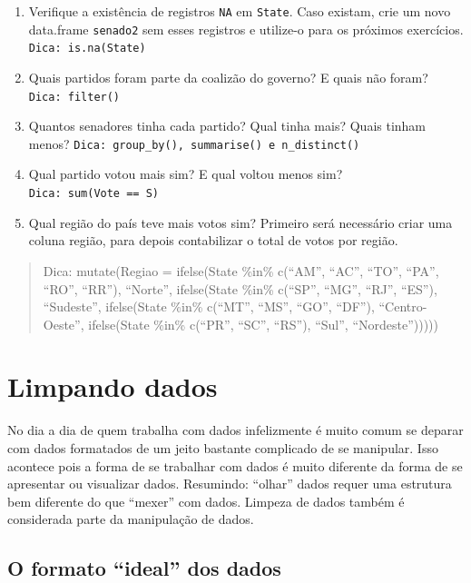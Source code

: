 \documentclass[]{book}
\begin{document}
\begin{enumerate}
\def\labelenumi{\arabic{enumi}.}
\item
  Verifique a existência de registros \texttt{NA} em \texttt{State}.
  Caso existam, crie um novo data.frame \texttt{senado2} sem esses
  registros e utilize-o para os próximos exercícios.
  \texttt{Dica:\ is.na(State)}
\item
  Quais partidos foram parte da coalizão do governo? E quais não foram?
  \texttt{Dica:\ filter()}
\item
  Quantos senadores tinha cada partido? Qual tinha mais? Quais tinham
  menos? \texttt{Dica:\ group\_by(),\ summarise()\ e\ n\_distinct()}
\item
  Qual partido votou mais sim? E qual voltou menos sim?
  \texttt{Dica:\ sum(Vote\ ==\ \textquotesingle{}S\textquotesingle{})}
\item
  Qual região do país teve mais votos sim? Primeiro será necessário
  criar uma coluna região, para depois contabilizar o total de votos por
  região.
\end{enumerate}

\begin{quote}
Dica: mutate(Regiao = ifelse(State \%in\% c(``AM'', ``AC'', ``TO'',
``PA'', ``RO'', ``RR''), ``Norte'', ifelse(State \%in\% c(``SP'',
``MG'', ``RJ'', ``ES''), ``Sudeste'', ifelse(State \%in\% c(``MT'',
``MS'', ``GO'', ``DF''), ``Centro-Oeste'', ifelse(State \%in\% c(``PR'',
``SC'', ``RS''), ``Sul'', ``Nordeste'')))))
\end{quote}

\chapter{Limpando dados}\label{limpando-dados}

No dia a dia de quem trabalha com dados infelizmente é muito comum se
deparar com dados formatados de um jeito bastante complicado de se
manipular. Isso acontece pois a forma de se trabalhar com dados é muito
diferente da forma de se apresentar ou visualizar dados. Resumindo:
``olhar'' dados requer uma estrutura bem diferente do que ``mexer'' com
dados. Limpeza de dados também é considerada parte da manipulação de
dados.

\section{\texorpdfstring{O formato ``ideal'' dos
dados}{O formato ideal dos dados}}\label{o-formato-ideal-dos-dados}
\end{document}
